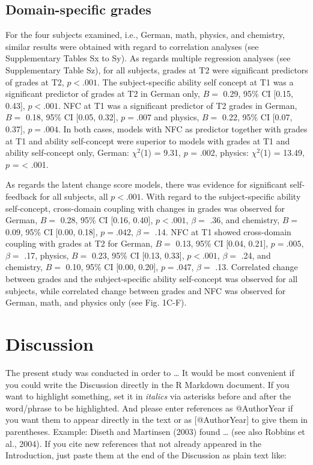 \documentclass[
  man]{apa6}
\begin{document}
\hypertarget{domain-specific-grades}{%
\subsection{Domain-specific grades}\label{domain-specific-grades}}

For the four subjects examined, i.e., German, math, physics, and chemistry, similar results were obtained with regard to correlation analyses (see Supplementary Tables Sx to Sy). As regards multiple regression analyses (see Supplementary Table Sz), for all subjects, grades at T2 were significant predictors of grades at T2, \(p<.001\). The subject-specific ability self concept at T1 was a significant predictor of grades at T2 in German only, \(B=\) 0.29, 95\% CI {[}0.15, 0.43{]}, \(p< .001\). NFC at T1 was a significant predictor of T2 grades in German, \(B=\) 0.18, 95\% CI {[}0.05, 0.32{]}, \(p=.007\) and physics, \(B=\) 0.22, 95\% CI {[}0.07, 0.37{]}, \(p=.004\). In both cases, models with NFC as predictor together with grades at T1 and ability self-concept were superior to models with grades at T1 and ability self-concept only, German: \(\chi^2\)(1) = 9.31, \(p\) = .002, physics: \(\chi^2\)(1) = 13.49, \(p\) = \textless{} .001.

As regards the latent change score models, there was evidence for significant self-feedback for all subjects, all \(p<.001\). With regard to the subject-specific ability self-concept, cross-domain coupling with changes in grades was observed for German, \(B=\) 0.28, 95\% CI {[}0.16, 0.40{]}, \(p< .001\), \(\beta=\) .36, and chemistry, \(B=\) 0.09, 95\% CI {[}0.00, 0.18{]}, \(p=.042\), \(\beta=\) .14. NFC at T1 showed cross-domain coupling with grades at T2 for German, \(B=\) 0.13, 95\% CI {[}0.04, 0.21{]}, \(p=.005\), \(\beta=\) .17, physics, \(B=\) 0.23, 95\% CI {[}0.13, 0.33{]}, \(p< .001\), \(\beta=\) .24, and chemistry, \(B=\) 0.10, 95\% CI {[}0.00, 0.20{]}, \(p=.047\), \(\beta=\) .13. Correlated change between grades and the subject-specific ability self-concept was observed for all subjects, while correlated change between grades and NFC was observed for German, math, and physics only (see Fig. 1C-F).

\hypertarget{discussion}{%
\section{Discussion}\label{discussion}}

The present study was conducted in order to \ldots{} It would be most convenient if you could write the Discussion directly in the R Markdown document. If you want to highlight something, set it in \emph{italics} via asterisks before and after the word/phrase to be highlighted. And please enter references as @AuthorYear if you want them to appear directly in the text or as {[}@AuthorYear{]} to give them in parentheses. Example: Diseth and Martinsen (2003) found \ldots{} (see also Robbins et al., 2004). If you cite new references that not already appeared in the Introduction, just paste them at the end of the Discussion as plain text like:
\end{document}
